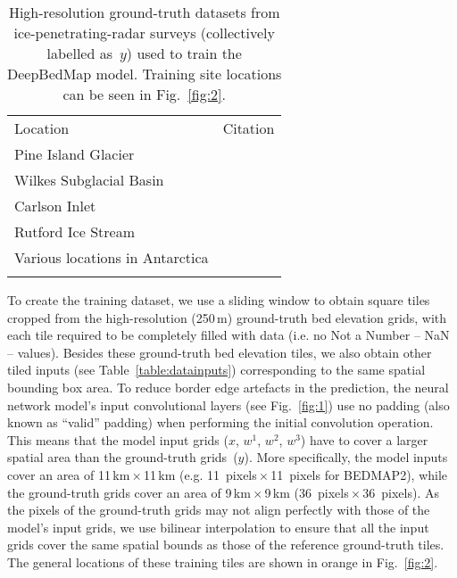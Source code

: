 \begin{table}[ht]
  \centering
  \footnotesize
  \setlength{\tabcolsep}{5pt}
  \caption[High-resolution ground-truth datasets for training DeepBedMap]{
    High-resolution ground-truth datasets from ice-penetrating-radar surveys (collectively labelled as~$y$) used to train the DeepBedMap model.
    Training site locations can be seen in Fig.~\ref{fig:2}.
  }
  \label{table:groundtruthdata}
  \begin{tabular}{ll}
  \tophline
  Location                        & Citation                                         \\
  \middlehline
  Pine Island Glacier             & \citet{BinghamDiverselandscapesPine2017}         \\
  Wilkes Subglacial Basin         & \citet{JordanHypothesismegaoutburstflooding2010} \\
  Carlson Inlet                   & \citet{KingIcestreamnot2011}                     \\
  Rutford Ice Stream              & \citet{KingSubglaciallandformsRutford2016}       \\
  Various locations in Antarctica & \citet{ShiMultichannelCoherentRadar2010}         \\
  \bottomhline
  \end{tabular}
\end{table}

To create the training dataset, we use a sliding window to obtain square tiles cropped from the high-resolution (250\,\unit{m}) ground-truth bed elevation grids, with each tile required to be completely filled with data (i.e.
no Not a Number -- NaN -- values).
Besides these ground-truth bed elevation tiles, we also obtain other tiled inputs (see Table~\ref{table:datainputs}) corresponding to the same spatial bounding box area.
To reduce border edge artefacts in the prediction, the neural network model's input convolutional layers (see Fig.~\ref{fig:1}) use no padding (also known as ``valid'' padding) when performing the initial convolution operation.
This means that the model input grids ($x$, $w^1$, $w^2$, $w^3$) have to cover a larger spatial area than the ground-truth grids~($y$).
More specifically, the model inputs cover an area of 11\,\unit{km}\,$\times$\,11\,\unit{km} (e.g. 11~\unit{pixels}\,$\times$\,11~\unit{pixels} for BEDMAP2), while the ground-truth grids cover an area of 9\,\unit{km}\,$\times$\,9\,\unit{km} (36~\unit{pixels}\,$\times$\,36~\unit{pixels}).
As the pixels of the ground-truth grids may not align perfectly with those of the model's input grids, we use bilinear interpolation to ensure that all the input grids cover the same spatial bounds as those of the reference ground-truth tiles.
The general locations of these training tiles are shown in orange in Fig.~\ref{fig:2}.

